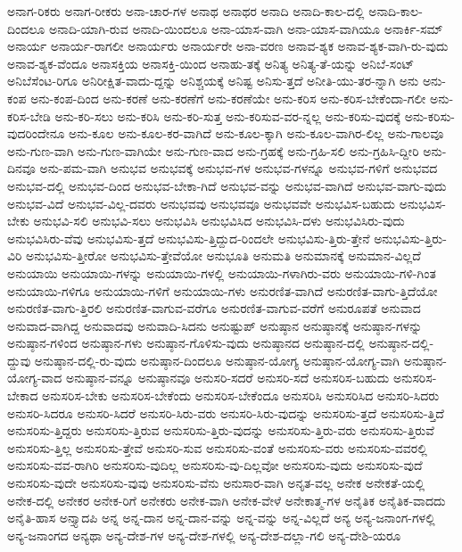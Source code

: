 {ಅನಾಗ-ರಿಕರು
ಅನಾಗ-ರೀಕರು
ಅನಾ-ಚಾರ-ಗಳ
ಅನಾಥ
ಅನಾಥರ
ಅನಾದಿ
ಅನಾದಿ-ಕಾಲ-ದಲ್ಲಿ
ಅನಾದಿ-ಕಾಲ-ದಿಂದಲೂ
ಅನಾದಿ-ಯಾಗಿ-ರುವ
ಅನಾದಿ-ಯಿಂದಲೂ
ಅನಾ-ಯಾಸ-ವಾಗಿ
ಅನಾ-ಯಾಸ-ವಾಗಿಯೂ
ಅನಾರ್ಕಿ-ಸಮ್
ಅನಾರ್ಯ
ಅನಾರ್ಯ-ರಾಗಲೀ
ಅನಾರ್ಯರು
ಅನಾರ್ಯರೇ
ಅನಾ-ವರಣ
ಅನಾವ-ಶ್ಯಕ
ಅನಾವ-ಶ್ಯಕ-ವಾಗಿ-ರು-ವುದು
ಅನಾವ-ಶ್ಯಕ-ವೆಂದೂ
ಅನಾಸಕ್ತಿಯ
ಅನಾಸಕ್ತಿ-ಯಿಂದ
ಅನಾಹು-ತಕ್ಕೆ
ಅನಿತ್ಯ
ಅನಿತ್ಯ-ತೆ-ಯನ್ನು
ಅನಿಬೆ-ಸಂಟ್
ಅನಿಬೆಸೆಂಟ-ರಿಗೂ
ಅನಿರೀಕ್ಷಿತ-ವಾದು-ದ್ದನ್ನು
ಅನಿಶ್ಚಯಕ್ಕೆ
ಅನಿಷ್ಟ
ಅನಿಸು-ತ್ತದೆ
ಅನೀತಿ-ಯು-ತರ-ನ್ನಾಗಿ
ಅನು
ಅನು-ಕಂಪ
ಅನು-ಕಂಪ-ದಿಂದ
ಅನು-ಕರಣೆ
ಅನು-ಕರಣೆಗೆ
ಅನು-ಕರಣೆಯೇ
ಅನು-ಕರಿಸ
ಅನು-ಕರಿಸ-ಬೇಕೆಂದಾ-ಗಲೀ
ಅನು-ಕರಿಸ-ಬೇಡಿ
ಅನು-ಕರಿ-ಸಲು
ಅನು-ಕರಿಸಿ
ಅನು-ಕರಿ-ಸುತ್ತ
ಅನು-ಕರಿಸುವ-ವರ-ನ್ನಲ್ಲ
ಅನು-ಕರಿಸು-ವುದಕ್ಕೆ
ಅನು-ಕರಿಸು-ವುದರಿಂದೇನೂ
ಅನು-ಕೂಲ
ಅನು-ಕೂಲ-ಕರ-ವಾಗಿದೆ
ಅನು-ಕೂಲ-ಕ್ಕಾಗಿ
ಅನು-ಕೂಲ-ವಾಗಿರ-ಲಿಲ್ಲ
ಅನು-ಗಾಲವೂ
ಅನು-ಗುಣ-ವಾಗಿ
ಅನು-ಗುಣ-ವಾಗಿಯೇ
ಅನು-ಗುಣ-ವಾದ
ಅನು-ಗ್ರಹಕ್ಕೆ
ಅನು-ಗ್ರಹಿ-ಸಲಿ
ಅನು-ಗ್ರಹಿಸಿ-ದ್ದೀರಿ
ಅನು-ದಿನವೂ
ಅನು-ಪಮ-ವಾಗಿ
ಅನುಭವ
ಅನುಭವಕ್ಕೆ
ಅನುಭವ-ಗಳ
ಅನುಭವ-ಗಳನ್ನೂ
ಅನುಭವ-ಗಳಿಗೆ
ಅನುಭವದ
ಅನುಭವ-ದಲ್ಲಿ
ಅನುಭವ-ದಿಂದ
ಅನುಭವ-ಬೇಕಾ-ಗಿದೆ
ಅನುಭವ-ವನ್ನು
ಅನುಭವ-ವಾಗಿದೆ
ಅನುಭವ-ವಾಗು-ವುದು
ಅನುಭವ-ವಿದೆ
ಅನುಭವ-ವಿಲ್ಲ-ದವರು
ಅನುಭವವು
ಅನುಭವವೂ
ಅನುಭವವೇ
ಅನುಭವಿಸ-ಬಹುದು
ಅನುಭವಿಸ-ಬೇಕು
ಅನುಭವಿ-ಸಲಿ
ಅನುಭವಿ-ಸಲು
ಅನುಭವಿಸಿ
ಅನುಭವಿಸಿದ
ಅನುಭವಿಸಿ-ದಳು
ಅನುಭವಿಸಿರು-ವುದು
ಅನುಭವಿಸಿರು-ವೆವು
ಅನುಭವಿಸು-ತ್ತದೆ
ಅನುಭವಿಸು-ತ್ತಿದ್ದುದ-ರಿಂದಲೇ
ಅನುಭವಿಸು-ತ್ತಿರು-ತ್ತೇನೆ
ಅನುಭವಿಸು-ತ್ತಿರು-ವಿರಿ
ಅನುಭವಿಸು-ತ್ತೀರೋ
ಅನುಭವಿಸು-ತ್ತೇವೆಯೋ
ಅನುಭೂತಿ
ಅನುಮತಿ
ಅನುಮಾನಕ್ಕೆ
ಅನುಮಾನ-ವಿಲ್ಲದೆ
ಅನುಯಾಯಿ
ಅನುಯಾಯಿ-ಗಳನ್ನು
ಅನುಯಾಯಿ-ಗಳಲ್ಲಿ
ಅನುಯಾಯಿ-ಗಳಾಗಿರು-ವರು
ಅನುಯಾಯಿ-ಗಳಿ-ಗಿಂತ
ಅನುಯಾಯಿ-ಗಳಿಗೂ
ಅನುಯಾಯಿ-ಗಳಿಗೆ
ಅನುಯಾಯಿ-ಗಳು
ಅನುರಣಿತ-ವಾಗಿದೆ
ಅನುರಣಿತ-ವಾಗು-ತ್ತಿದೆಯೋ
ಅನುರಣಿತ-ವಾಗು-ತ್ತಿರಲಿ
ಅನುರಣಿತ-ವಾಗುವ-ವರೆಗೂ
ಅನುರಣಿತ-ವಾಗುವ-ವರೆಗೆ
ಅನುರೂಪತೆ
ಅನುವಾದ
ಅನುವಾದ-ವಾಗಿದ್ದ
ಅನುವಾದವು
ಅನುವಾದಿ-ಸಿದನು
ಅನುಷ್ಟುಪ್
ಅನುಷ್ಠಾನ
ಅನುಷ್ಠಾನಕ್ಕೆ
ಅನುಷ್ಠಾನ-ಗಳನ್ನು
ಅನುಷ್ಠಾನ-ಗಳಿಂದ
ಅನುಷ್ಠಾನ-ಗಳು
ಅನುಷ್ಠಾನ-ಗೊಳಿಸು-ವುದು
ಅನುಷ್ಠಾನದ
ಅನುಷ್ಠಾನ-ದಲ್ಲಿ
ಅನುಷ್ಠಾನ-ದಲ್ಲಿ-ದ್ದುವು
ಅನುಷ್ಠಾನ-ದಲ್ಲಿ-ರು-ವುದು
ಅನುಷ್ಠಾನ-ದಿಂದಲೂ
ಅನುಷ್ಠಾನ-ಯೋಗ್ಯ
ಅನುಷ್ಠಾನ-ಯೋಗ್ಯ-ವಾಗಿ
ಅನುಷ್ಠಾನ-ಯೋಗ್ಯ-ವಾದ
ಅನುಷ್ಠಾನ-ವನ್ನೂ
ಅನುಷ್ಠಾನವೂ
ಅನುಸರಿ-ಸದರೆ
ಅನುಸರಿ-ಸದೆ
ಅನುಸರಿಸ-ಬಹುದು
ಅನುಸರಿಸ-ಬೇಕಾದ
ಅನುಸರಿಸ-ಬೇಕು
ಅನುಸರಿಸ-ಬೇಕೆಂದು
ಅನುಸರಿಸ-ಬೇಕೆಂದೂ
ಅನುಸರಿಸಿ
ಅನುಸರಿಸಿದ
ಅನುಸರಿ-ಸಿದರು
ಅನುಸರಿ-ಸಿದರೂ
ಅನುಸರಿ-ಸಿದರೆ
ಅನುಸರಿ-ಸಿರು-ವರು
ಅನುಸರಿ-ಸಿರು-ವುದನ್ನು
ಅನುಸರಿಸು-ತ್ತದೆ
ಅನುಸರಿಸು-ತ್ತಿದೆ
ಅನುಸರಿಸು-ತ್ತಿದ್ದರು
ಅನುಸರಿಸು-ತ್ತಿರುವ
ಅನುಸರಿಸು-ತ್ತಿರು-ವುದನ್ನು
ಅನುಸರಿಸು-ತ್ತಿರು-ವರು
ಅನುಸರಿಸು-ತ್ತಿರುವೆ
ಅನುಸರಿಸು-ತ್ತಿಲ್ಲ
ಅನುಸರಿಸು-ತ್ತೇವೆ
ಅನುಸರಿ-ಸುವ
ಅನುಸರಿಸು-ವಂತೆ
ಅನುಸರಿಸು-ವರು
ಅನುಸರಿಸು-ವವರಲ್ಲಿ
ಅನುಸರಿಸು-ವವ-ರಾಗಿರಿ
ಅನುಸರಿಸು-ವುದಿಲ್ಲ
ಅನುಸರಿಸು-ವು-ದಿಲ್ಲವೋ
ಅನುಸರಿಸು-ವುದು
ಅನುಸರಿಸು-ವುದೆ
ಅನುಸರಿಸು-ವುದೇ
ಅನುಸರಿಸು-ವುವು
ಅನುಸರಿಸು-ವೆನು
ಅನುಸಾರ-ವಾಗಿ
ಅನೃತ-ವಲ್ಲ
ಅನೇಕ
ಅನೇಕತೆ-ಯಲ್ಲಿ
ಅನೇಕ-ದಲ್ಲಿ
ಅನೇಕರ
ಅನೇಕ-ರಿಗೆ
ಅನೇಕರು
ಅನೇಕ-ವಾಗಿ
ಅನೇಕ-ವೇಳೆ
ಅನೇಕಾತ್ಮ-ಗಳ
ಅನೈತಿಕ
ಅನೈತಿಕ-ವಾದದು
ಅನೈತಿ-ಹಾಸ
ಅನ್ತ್ಯಾದಪಿ
ಅನ್ನ
ಅನ್ನ-ದಾನ
ಅನ್ನ-ದಾನ-ವನ್ನು
ಅನ್ನ-ವನ್ನು
ಅನ್ನ-ವಿಲ್ಲದೆ
ಅನ್ಯ
ಅನ್ಯ-ಜನಾಂಗ-ಗಳಲ್ಲಿ
ಅನ್ಯ-ಜನಾಂಗದ
ಅನ್ಯಥಾ
ಅನ್ಯ-ದೇಶ-ಗಳ
ಅನ್ಯ-ದೇಶ-ಗಳಲ್ಲಿ
ಅನ್ಯ-ದೇಶ-ದಲ್ಲಾ-ಗಲಿ
ಅನ್ಯ-ದೇಶಿ-ಯರೂ
}
